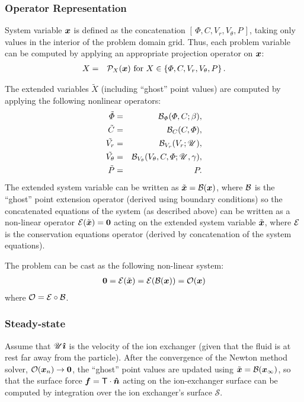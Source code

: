 \subsubsection{Operator Representation}
System variable $\boldsymbol{x}$ is defined as the concatenation $[\,\varPhi, C, V_r, V_\theta, P\,]$,
taking only values in the interior of the problem domain grid.
Thus, each problem variable can be computed by applying an appropriate projection operator on $\boldsymbol{x}$:
\begin{eqnarray}
X &=& \mathcal{P}_X(\boldsymbol{x}) \mbox{ for } X \in \left\{\varPhi, C, V_r, V_\theta, P\right\}.
\end{eqnarray}

The extended variables $\tilde X$ (including ``ghost'' point values) 
are computed by applying the following nonlinear operators:
\begin{eqnarray}
\tilde{\varPhi} &=& \mathcal{B}_\varPhi(\varPhi, C; \beta), \\
\tilde{C} &=& \mathcal{B}_C(C, \varPhi), \\
\tilde{V_r} &=& \mathcal{B}_{V_r}(V_r; \mathscr{U}), \\
\tilde{V_\theta} &=& \mathcal{B}_{V_\theta}(V_\theta, C, \varPhi; \mathscr{U}, \gamma), \\
\tilde{P} &=& P.
\end{eqnarray}
The extended system variable can be written as $\tilde{\boldsymbol{x}} = \mathcal{B}(\boldsymbol{x})$, 
where $\mathcal{B}$ is the ``ghost'' point extension operator (derived using boundary conditions)
so the concatenated equations of the system (as described above) can be written 
as a non-linear operator $\mathcal{E}(\tilde{\boldsymbol{x}}) = \boldsymbol{0}$ acting on the extended system variable 
$\tilde{\boldsymbol{x}}$, where $\mathcal{E}$ is the conservation equations operator 
(derived by concatenation of the system equations).

The problem can be cast as the following non-linear system:
\begin{eqnarray}
\boldsymbol{0} = \mathcal{E} (\tilde{\boldsymbol{x}}) = \mathcal{E} (\mathcal{B} (\boldsymbol{x})) = \mathcal{O}(\boldsymbol{x})
\end{eqnarray}
 where $\mathcal{O} = \mathcal{E} \circ \mathcal{B}$.

\subsubsection{Steady-state}
Assume that $\mathscr{U} \boldsymbol{\hat{\imath}}$ is the velocity of the ion exchanger 
(given that the fluid is at rest far away from the particle).
After the convergence of the Newton method solver, $\mathcal{O}(\boldsymbol{x}_n) \rightarrow \boldsymbol{0}$, 
the ``ghost'' point values are updated using $\tilde{\boldsymbol{x}} = \mathcal{B}(\boldsymbol{x}_\infty)$,
so  that the surface force $\boldsymbol{f} = \mathsf{T} \cdot \boldsymbol{\hat{n}}$ acting 
on the ion-exchanger surface
can be computed by integration over the ion exchanger's surface $\mathcal S$.

